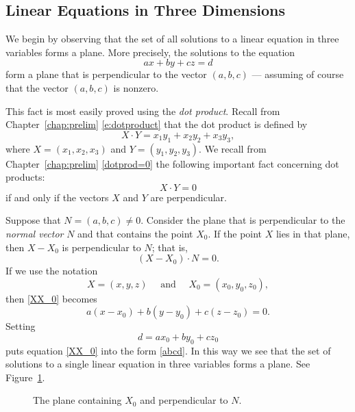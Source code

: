 \documentclass{ximera}
\begin{document}
\subsection*{Linear Equations in Three Dimensions}

We begin by observing that the set of all solutions to a linear
equation in three variables forms a plane.  More
precisely, the solutions to the equation
\begin{equation} \label{abcd}
ax+by+cz=d
\end{equation}
form a plane that is perpendicular to the vector $(a,b,c)$ ---
assuming of course that the vector $(a,b,c)$ is nonzero.

This fact is most easily proved using the {\em dot product\/}.
Recall from Chapter~\ref{chap:prelim} \eqref{e:dotproduct} that
the dot product is defined by
\[
X\cdot Y = x_1y_1+x_2y_2+x_3y_3,
\]
where $X=(x_1,x_2,x_3)$ and $Y=(y_1,y_2,y_3)$.  We recall from
Chapter~\ref{chap:prelim} \eqref{dotprod=0} the following important
fact concerning dot products:
\[
X\cdot Y = 0
\]
if and only if the vectors $X$ and $Y$ are perpendicular.

Suppose that $N=(a,b,c)\neq 0$.  Consider the plane that is perpendicular
to the {\em normal vector\/} $N$ and that contains the
point $X_0$.  If the point $X$ lies in that plane, then $X-X_0$ is
perpendicular to $N$; that is,
\begin{equation} \label{XX_0}
(X-X_0)\cdot N = 0.
\end{equation}
If we use the notation
\[
X=(x,y,z) \quad \mbox{ and } \quad X_0=(x_0,y_0,z_0),
\]
then \eqref{XX_0} becomes
\[
a(x-x_0)+b(y-y_0)+c(z-z_0)=0.
\]
Setting
\[
d=ax_0 + by_0 + cz_0
\]
puts equation \eqref{XX_0} into the form \eqref{abcd}.  In this way
we see that the set of solutions to a single linear equation in
three variables forms a plane.  See Figure~\ref{F:plane}.

\begin{figure}[htb]
              \centerline{%
              }
              \caption{The plane containing $X_0$ and perpendicular to $N$.}
              \label{F:plane}
\end{figure}
\end{document}
